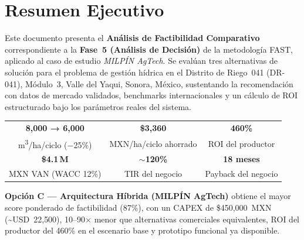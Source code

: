 \documentclass[12pt,letterpaper]{article}
\begin{document}
\nopagecolor
\pagecolor{white}

\tableofcontents
\newpage

\section{Resumen Ejecutivo}

Este documento presenta el \textbf{Análisis de Factibilidad Comparativo} correspondiente
a la \textbf{Fase~5 (Análisis de Decisión)} de la metodología FAST, aplicado al caso de
estudio \textit{MILPÍN AgTech}. Se evalúan tres alternativas de solución para el problema
de gestión hídrica en el Distrito de Riego~041 (DR-041), Módulo~3, Valle del Yaqui, Sonora,
México, sustentando la recomendación con datos de mercado validados, benchmarks
internacionales y un cálculo de ROI estructurado bajo los parámetros reales del sistema.

\begin{kpiBox}
  \color{white}\centering
  \begin{tabular}{ccc}
    {\Large\bfseries 8{,}000 → 6{,}000}
    & {\Large\bfseries \$3{,}360}
    & {\Large\bfseries 460\%} \\
    {\small m\textsuperscript{3}/ha/ciclo (−25\%)}
    & {\small MXN/ha/ciclo ahorrado}
    & {\small ROI del productor} \\[6pt]
    {\Large\bfseries \$4.1\,M}
    & {\Large\bfseries $\sim$120\%}
    & {\Large\bfseries 18 meses} \\
    {\small MXN VAN (WACC 12\%)}
    & {\small TIR del negocio}
    & {\small Payback del negocio}
  \end{tabular}
\end{kpiBox}

\vspace{6pt}

\begin{recuadroVerde}[title=Recomendación]
  \textbf{Opción C — Arquitectura Híbrida (MILPÍN AgTech)} obtiene el mayor score ponderado
  de factibilidad (87\%), con un CAPEX de \$450{,}000~MXN (\textasciitilde{}USD~22{,}500),
  10--90× menor que alternativas comerciales equivalentes, ROI del productor del 460\% en el
  escenario base y prototipo funcional ya disponible.
\end{recuadroVerde}

\vspace{4pt}
\end{document}
